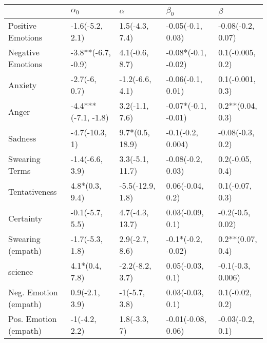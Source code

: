 \begin{tabular}{lllll}
\toprule
{} &           $\alpha_0$ &          $\alpha$ &            $\beta_0$ &            $\beta$ \\
\midrule
Positive Emotions     &      -1.6(-5.2, 2.1) &    1.5(-4.3, 7.4) &    -0.05(-0.1, 0.03) &  -0.08(-0.2, 0.07) \\
Negative Emotions     &   -3.8**(-6.7, -0.9) &    4.1(-0.6, 8.7) &  -0.08*(-0.1, -0.02) &   0.1(-0.005, 0.2) \\
Anxiety               &        -2.7(-6, 0.7) &   -1.2(-6.6, 4.1) &    -0.06(-0.1, 0.01) &   0.1(-0.001, 0.3) \\
Anger                 &  -4.4***(-7.1, -1.8) &    3.2(-1.1, 7.6) &  -0.07*(-0.1, -0.01) &   0.2**(0.04, 0.3) \\
Sadness               &       -4.7(-10.3, 1) &   9.7*(0.5, 18.9) &    -0.1(-0.2, 0.004) &   -0.08(-0.3, 0.2) \\
Swearing Terms        &      -1.4(-6.6, 3.9) &   3.3(-5.1, 11.7) &    -0.08(-0.2, 0.03) &    0.2(-0.05, 0.4) \\
Tentativeness         &       4.8*(0.3, 9.4) &  -5.5(-12.9, 1.8) &     0.06(-0.04, 0.2) &    0.1(-0.07, 0.3) \\
Certainty             &      -0.1(-5.7, 5.5) &   4.7(-4.3, 13.7) &     0.03(-0.09, 0.1) &   -0.2(-0.5, 0.02) \\
Swearing (empath)     &      -1.7(-5.3, 1.8) &    2.9(-2.7, 8.6) &   -0.1*(-0.2, -0.02) &   0.2**(0.07, 0.4) \\
science               &       4.1*(0.4, 7.8) &   -2.2(-8.2, 3.7) &     0.05(-0.03, 0.1) &  -0.1(-0.3, 0.006) \\
Neg. Emotion (empath) &       0.9(-2.1, 3.9) &     -1(-5.7, 3.8) &     0.03(-0.03, 0.1) &    0.1(-0.02, 0.2) \\
Pos. Emotion (empath) &        -1(-4.2, 2.2) &      1.8(-3.3, 7) &   -0.01(-0.08, 0.06) &   -0.03(-0.2, 0.1) \\
\bottomrule
\end{tabular}
